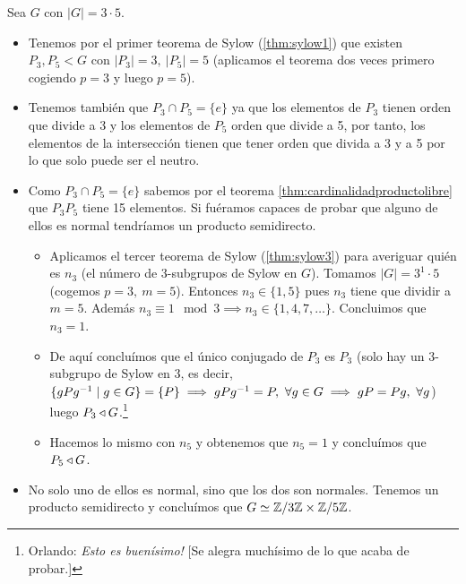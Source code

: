 \begin{ej}
	Sea $G$ con $|G| = 3\cdot 5$.
	\begin{itemize}
		\item Tenemos por el primer teorema de Sylow (\ref{thm:sylow1}) que existen $P_3, P_5 < G$ con $|P_3| = 3,\ |P_5| = 5$ (aplicamos el teorema dos veces primero cogiendo $p = 3$ y luego $p = 5$).
		\item Tenemos también que $P_3 \cap P_5 = \{e\}$ ya que los elementos de $P_3$ tienen orden que divide a 3 y los elementos de $P_5$ orden que divide a 5, por tanto, los elementos de la intersección tienen que tener orden que divida a 3 y a 5 por lo que solo puede ser el neutro.
		\item Como $P_3 \cap P_5 = \{e\}$ sabemos por el teorema \ref{thm:cardinalidadproductolibre} que $P_3 P_5$ tiene 15 elementos. Si fuéramos capaces de probar que alguno de ellos es normal tendríamos un producto semidirecto.
		\begin{itemize}
			\item Aplicamos el tercer teorema de Sylow (\ref{thm:sylow3}) para averiguar quién es $n_3$ (el número de 3-subgrupos de Sylow en $G$). Tomamos $|G| = 3^1 \cdot 5$ (cogemos $p = 3,\ m = 5$). Entonces $n_3 \in \{1, 5\}$ pues $n_3$ tiene que dividir a $m = 5$. Además $n_3 \equiv 1 \mod 3 \implies n_3 \in \{1, 4, 7, \dots\}$. Concluimos que $n_3 = 1$.
			\item De aquí concluímos que el único conjugado de $P_3$ es $P_3$ (solo hay un 3-subgrupo de Sylow en 3, es decir, $\{g P g^{-1} \mid g \in G\} = \{P\} \implies gPg^{-1} = P,\ \forall g \in G \implies gP = Pg,\ \forall g$) luego $P_3 \mathbin{\triangleleft} G$.\footnote{Orlando: \textit{Esto es buenísimo!} [Se alegra muchísimo de lo que acaba de probar.]}
			\item Hacemos lo mismo con $n_5$ y obtenemos que $n_5 = 1$ y concluímos que $P_5 \mathbin{\triangleleft} G$.
		\end{itemize}
		\item No solo uno de ellos es normal, sino que los dos son normales. Tenemos un producto semidirecto y concluímos que $G \simeq \mathbb{Z}/3\mathbb{Z} \times \mathbb{Z}/5\mathbb{Z}$.
	\end{itemize}
\end{ej}


